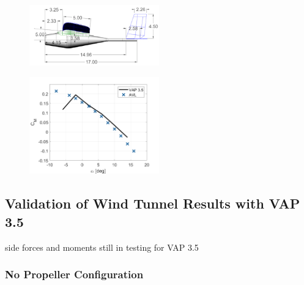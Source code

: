 \begin{figure}[H]
    \centering
    \includegraphics[width=0.5\textwidth]{05_Results/Figs/VAP/genMAV/dimensions.png}
    \label{fig:genMAVDimensions}
\end{figure}

\begin{figure}[H]
         \centering
         \includegraphics[width=0.5\textwidth]{05_Results/Figs/VAP/genMAV/GenMAVModelValidation1.png}
         \label{fig:genMAV_Cm}
         \caption{}
\end{figure}

       

       

\subsection{Validation of Wind Tunnel Results with VAP 3.5}
side forces and moments still in testing for VAP 3.5

\subsubsection{No Propeller Configuration}


